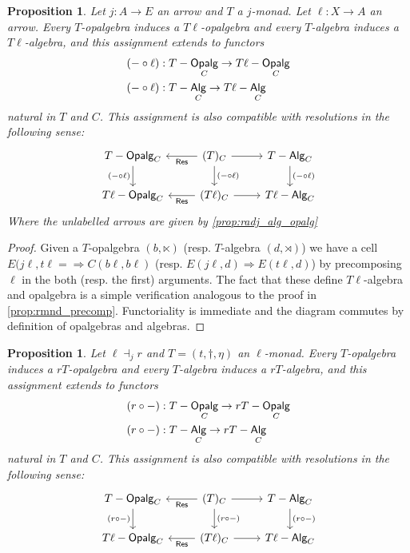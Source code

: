 \documentclass[10pt,a4paper]{article}
\newcommand{\cat}[1]{\textcat{#1}}
\newcommand{\textcat}[1]{{\normalfont\textsf{#1}}}
\newcommand{\To}{\Rightarrow}
\DeclareMathOperator{\Alg}{\cat{Alg}}
\DeclareMathOperator{\Opalg}{\cat{Opalg}}
\theoremstyle{plain}
\newtheorem{proposition}[theorem]{Proposition}
\theoremstyle{definition}
\theoremstyle{remark}
\begin{document}
\begin{proposition}
    Let $j : A \to E$ an arrow and $T$ a $j$-monad. Let $\ell : X \to A$ an arrow. Every $T$-opalgebra induces a $T\ell$-opalgebra and every $T$-algebra induces a $T\ell$-algebra, and this assignment extends to functors
    \begin{align*}
        (-\circ\ell) &: T-\Opalg_C \to T\ell-\Opalg_C\\
        (-\circ\ell) &: T-\Alg_C \to T\ell-\Alg_C
    \end{align*}
    natural in $T$ and $C$. This assignment is also compatible with resolutions in the following sense:
    \[\begin{tikzcd}
        \ar[d, "{(-\circ\ell)}"'] T-\Opalg_C & \lar \cat{Res}(T)_C \ar[d, "{(-\circ\ell)}"] \rar & T-\Alg_C \ar[d, "{(-\circ\ell)}"]\\
        T\ell-\Opalg_C & \lar \cat{Res}(T\ell)_C \rar & T\ell-\Alg_C
    \end{tikzcd}\]
    Where the unlabelled  arrows are given by \ref{prop:radj_alg_opalg}
\end{proposition}

\begin{proof}
    Given a $T$-opalgebra $(b, \ltimes)$ (resp. $T$-algebra $(d, \rtimes)$) we have a cell $E(j\ell, t\ell=\To C(b\ell, b\ell)$ (resp. $E(j\ell, d) \To E(t\ell, d)$) by precomposing $\ell$ in the both (resp. the first) arguments. The fact that these define $T\ell$-algebra and opalgebra is a simple verification analogous to the proof in \ref{prop:rmnd_precomp}. Functoriality is immediate and the diagram commutes by definition of opalgebras and algebras.
\end{proof}

\begin{proposition}
    Let $\ell\dashv_jr$ and $T = (t, \dag, \eta)$ an $\ell$-monad. Every $T$-opalgebra induces a $rT$-opalgebra and every $T$-algebra induces a $rT$-algebra, and this assignment extends to functors
    \begin{align*}
        (r\circ-) &: T-\Opalg_C \to rT-\Opalg_C\\
        (r\circ-) &: T-\Alg_C \to rT-\Alg_C
    \end{align*}
    natural in $T$ and $C$. This assignment is also compatible with resolutions in the following sense:
    \[\begin{tikzcd}
        \ar[d, "{(r\circ-)}"'] T-\Opalg_C & \lar \cat{Res}(T)_C \ar[d, "{}(r\circ-)"] \rar & T-\Alg_C \ar[d, "{(r\circ-)}"]\\
        T\ell-\Opalg_C & \lar \cat{Res}(T\ell)_C \rar & T\ell-\Alg_C
    \end{tikzcd}\]
\end{proposition}
\end{document}
